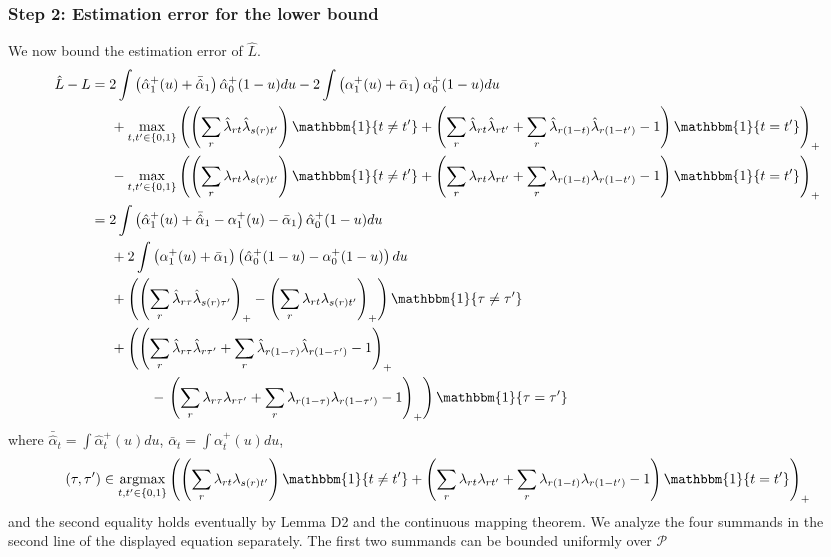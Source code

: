 \documentclass[12pt]{article}
\theoremstyle{definition}
\newcommand{\argmax}{\operatornamewithlimits{argmax}}
\begin{document}
{\subsubsection{Step 2: Estimation error for the lower bound}
We now bound the estimation error of $\hat{L} $.   
\begin{align*}
\hat{L} - L &= 2\int \left(\hat{\alpha}_1^{+}(u) + \bar{\hat{\alpha}}_{1}\right)\hat{\alpha}_0^{+}(1-u) du - 2\int \left(\alpha_1^{+}(u) + \bar{\alpha}_{1}\right)\alpha_0^{+}(1-u) du \\
&\hspace{5mm}+ \max_{t,t' \in \{0,1\}}\left(\left(\sum_r \hat{\lambda}_{rt}\hat{\lambda}_{s(r)t'}\right)\mathbbm{1}\{t \neq t'\} + 
\left(\sum_r \hat{\lambda}_{rt}\hat{\lambda}_{rt'} + \sum_r \hat{\lambda}_{r(1-t)}\hat{\lambda}_{r(1-t')} - 1 \right)\mathbbm{1}\{t = t'\}\right)_{+} \\
&\hspace{5mm}- \max_{t,t' \in \{0,1\}}\left(\left(\sum_r {\lambda}_{rt}{\lambda}_{s(r)t'}\right)\mathbbm{1}\{t \neq t'\} + \left(\sum_r {\lambda}_{rt}{\lambda}_{rt'} + \sum_r {\lambda}_{r(1-t)}{\lambda}_{r(1-t')} - 1 \right)\mathbbm{1}\{t = t'\}\right)_{+} \\
&= 2\int\left(\hat{\alpha}_1^{+}(u)  + \bar{\hat{\alpha}}_{1} - \alpha_1^{+}(u) - \bar{\alpha}_1 \right)\hat{\alpha}_0^{+}(1-u)du  \\
&\hspace{5mm}+ 2\int\left(\alpha_1^{+}(u) + \bar{\alpha}_1 \right)\left( \hat{\alpha}_0^{+}(1-u) -  \alpha_0^{+}(1-u)\right)du \\
&\hspace{5mm}+ \left(\left(\sum_r \hat{\lambda}_{r\tau}\hat{\lambda}_{s(r)\tau'}\right)_{+} - \left(\sum_r {\lambda}_{rt}{\lambda}_{s(r)t'}\right)_{+}\right)\mathbbm{1}\{\tau \neq \tau'\}  \\
&\hspace{5mm}+  \left(\left(\sum_r \hat{\lambda}_{r\tau}\hat{\lambda}_{r\tau'} + \sum_r \hat{\lambda}_{r(1-\tau)}\hat{\lambda}_{r(1-\tau')} - 1 \right)_{+} \right. \\
&\hspace{15mm}- \left. \left(\sum_r {\lambda}_{r\tau}{\lambda}_{r\tau'} + \sum_r {\lambda}_{r(1-\tau)}{\lambda}_{r(1-\tau')} - 1 \right)_{+}\right)\mathbbm{1}\{\tau = \tau'\} 
\end{align*}
where $\bar{\hat{\alpha}}_{t} = \int\hat{\alpha}_t^{+}(u)du$, $\bar{\alpha}_{t} = \int\alpha_t^{+}(u)du$, \[(\tau, \tau') \in \argmax_{t,t' \in \{0,1\}}\left(\left(\sum_r {\lambda}_{rt}{\lambda}_{s(r)t'}\right)\mathbbm{1}\{t \neq t'\} + \left(\sum_r {\lambda}_{rt}{\lambda}_{rt'} + \sum_r {\lambda}_{r(1-t)}{\lambda}_{r(1-t')} - 1 \right)\mathbbm{1}\{t = t'\}\right)_{+}\] and the second equality holds eventually by Lemma D2 and the continuous mapping theorem. We analyze the four summands in the second line of the displayed equation separately. The first two summands can be bounded uniformly over $\mathcal{P}$  
}
\end{document}
